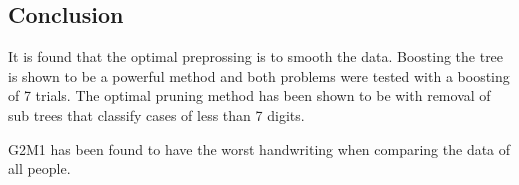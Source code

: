 \subsection{Conclusion}

It is found that the optimal preprossing is to smooth the data. 
Boosting the tree is shown to be a powerful method and both problems were tested with a boosting of 7 trials.
The optimal pruning method has been shown to be with removal of sub trees that classify cases of less than 7 digits.

G2M1
has been found to have the worst handwriting when comparing the data of all people.

